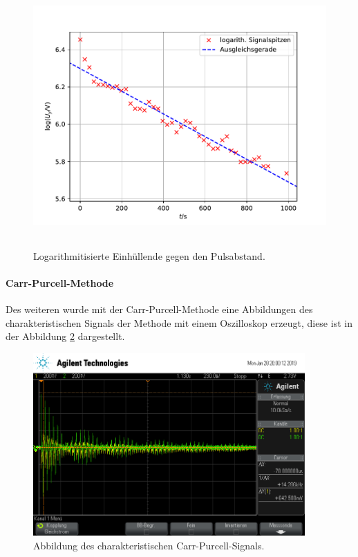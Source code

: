 \begin{figure}
  \centering
  \includegraphics[height = 10cm]{plots/T2plot.pdf}
  \caption{Logarithmitisierte Einhüllende gegen den Pulsabstand.}
  \label{fig:T2}
\end{figure}
\FloatBarrier
\paragraph{Carr-Purcell-Methode}
Des weiteren wurde mit der Carr-Purcell-Methode eine Abbildungen des charakteristischen Signals der Methode mit einem
Oszilloskop erzeugt, diese ist in der Abbildung \ref{fig:PCM} dargestellt.
\begin{figure}
  \centering
  \includegraphics[height = 7cm]{plots/scope_3.png}
  \caption{Abbildung des charakteristischen Carr-Purcell-Signals.}
  \label{fig:PCM}
\end{figure}
\FloatBarrier
